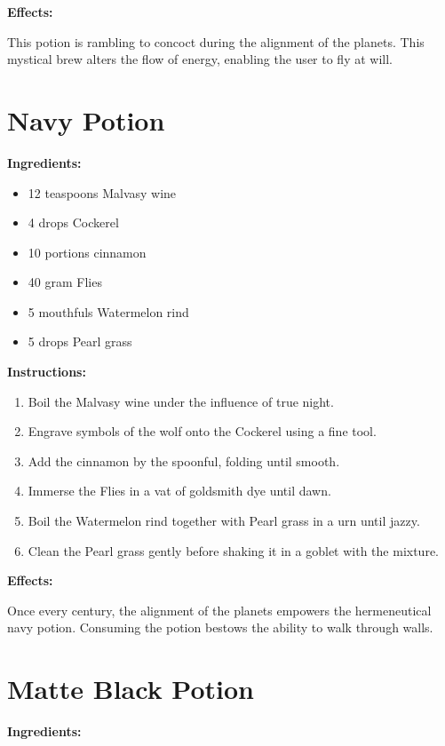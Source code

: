 \documentclass{article}
\begin{document}
\textbf{Effects:}

This potion is rambling to concoct during the alignment of the planets. This mystical brew alters the flow of energy, enabling the user to fly at will.

\newpage
\section*{Navy Potion}

\textbf{Ingredients:}

\begin{itemize}
  \item 12 teaspoons Malvasy wine
  \item 4 drops Cockerel
  \item 10 portions cinnamon
  \item 40 gram Flies
  \item 5 mouthfuls Watermelon rind
  \item 5 drops Pearl grass
\end{itemize}

\textbf{Instructions:}

\begin{enumerate}
  \item Boil the Malvasy wine under the influence of true night.
  \item Engrave symbols of the wolf onto the Cockerel using a fine tool.
  \item Add the cinnamon by the spoonful, folding until smooth.
  \item Immerse the Flies in a vat of goldsmith dye until dawn.
  \item Boil the Watermelon rind together with Pearl grass in a urn until jazzy.
  \item Clean the Pearl grass gently before shaking it in a goblet with the mixture.
\end{enumerate}

\textbf{Effects:}

Once every century, the alignment of the planets empowers the hermeneutical navy potion. Consuming the potion bestows the ability to walk through walls.

\newpage
\section*{Matte Black Potion}

\textbf{Ingredients:}
\end{document}
